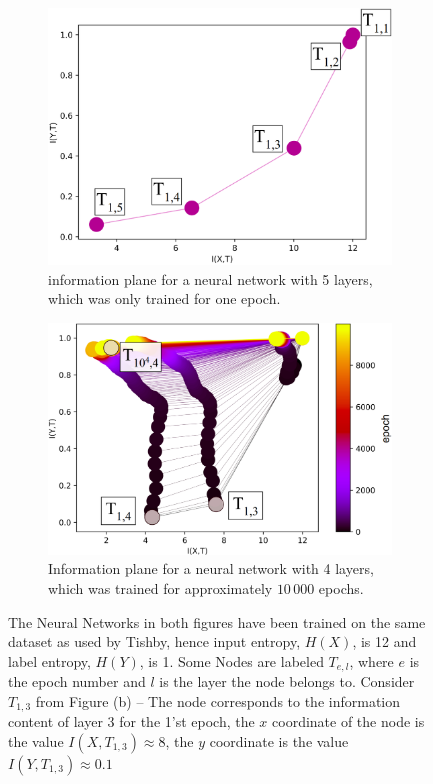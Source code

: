 \documentclass[dissertation.tex]{subfiles}
\begin{document}
\begin{figure}[H]
  \centering
  \begin{subfigure}[t]{0.48\textwidth}
    \centering
    \includegraphics[width=\textwidth]{figs/ip_1v3.png}
    \caption{
      information plane for a neural network with 5 layers, which was only trained
      for one epoch.
    }
    \label{fig:Ip1}
  \end{subfigure}
  \hfill
  \begin{subfigure}[t]{0.5\textwidth}
    \centering
    \includegraphics[width=\textwidth]{figs/ip_10000v3.png}
    \caption{
      Information plane for a neural network with 4 layers, which was trained
      for approximately $10\,000$ epochs.
    }
    \label{fig:Ip2}
  \end{subfigure}
  \caption{
    The Neural Networks in both figures have been trained on the same dataset as
    used by Tishby\cite{TISHBY}, hence input entropy, $H(X)$, is 12 and
    label entropy, $H(Y)$, is 1.
    Some Nodes are labeled $T_{e,l}$, where $e$ is the epoch number and $l$ is
    the layer the node belongs to. Consider $T_{1,3}$ from Figure (b) -- The
    node corresponds to the information content of layer 3 for the 1'st epoch,
    the $x$ coordinate of the node is the value $I(X, T_{1,3})\approx{8}$, the
    $y$ coordinate is the value $I(Y, T_{1,3})\approx{0.1}$
  }
\end{figure}
\end{document}
